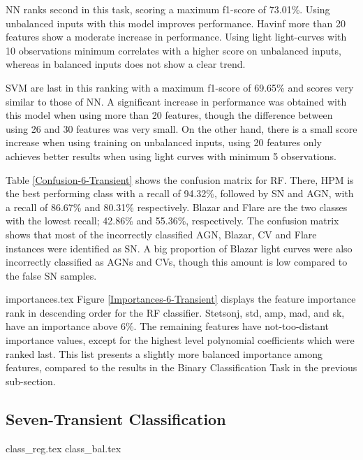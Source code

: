 \documentclass[a4paper,fleqn,usenatbib]{mnras}
\begin{document}
NN ranks second in this task, scoring a maximum f1-score of 73.01\%. 
Using unbalanced inputs with this model improves performance.
Havinf more than 20 features show a moderate increase in performance. 
Using light light-curves with 10 observations minimum correlates with
a higher score on unbalanced inputs, whereas in balanced inputs does
not show a clear trend.

SVM are last in this ranking with a maximum f1-score of 69.65\% and
scores very similar to those of NN. 
A significant increase in performance was obtained with this model when
using more than 20 features, though the difference between using 26
and 30 features was very small. 
On the other hand, there is a small score increase when using training
on unbalanced inputs, using 20 features only achieves better results
when using light curves with minimum 5 observations. 

Table \ref{Confusion-6-Transient} shows the confusion matrix for RF. 
There, HPM is the best performing class with a recall of 94.32\%, 
followed by SN and AGN, with a recall of 86.67\% and 80.31\%
respectively. 
Blazar and Flare are the two classes with the lowest recall; 42.86\%
and 55.36\%, respectively. 
The confusion matrix shows that most of the incorrectly
classified AGN, Blazar, CV and Flare instances were identified as
SN. A big proportion of Blazar light curves were also incorrectly
classified as AGNs and CVs, though this amount is low compared to the
false SN samples. 


{importances.tex} Figure
\ref{Importances-6-Transient} displays the feature importance rank in
descending order for the RF classifier.
Stetson\textunderscore j, std, amp, mad, and sk, have an importance above 6\%. 
The remaining features have not-too-distant importance values, except
for the highest level polynomial coefficients which were ranked last.
This list presents a slightly more balanced importance among features,
compared to the results in the Binary Classification Task in the
previous sub-section.


\subsection{Seven-Transient Classification}

{class_reg.tex}
{class_bal.tex}
\end{document}
